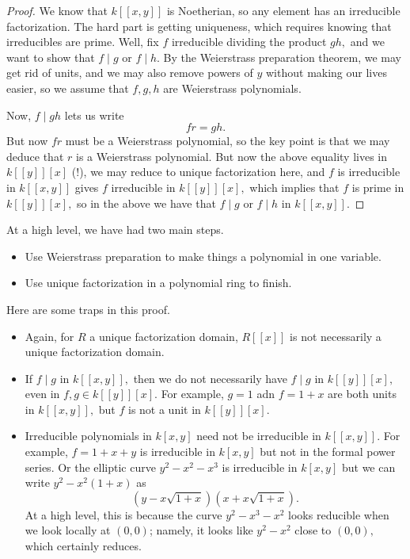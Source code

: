 \documentclass[../notes.tex]{subfiles}
\begin{document}
\begin{proof}
	We know that $k[[x,y]]$ is Noetherian, so any element has an irreducible factorization. The hard part is getting uniqueness, which requires knowing that irreducibles are prime. Well, fix $f$ irreducible dividing the product $gh,$ and we want to show that $f\mid g$ or $f\mid h.$ By the Weierstrass preparation theorem, we may get rid of units, and we may also remove powers of $y$ without making our lives easier, so we assume that $f,g,h$ are Weierstrass polynomials.

	Now, $f\mid gh$ lets us write
	\[fr=gh.\]
	But now $fr$ must be a Weierstrass polynomial, so the key point is that we may deduce that $r$ is a Weierstrass polynomial. But now the above equality lives in $k[[y]][x]$ (!), we may reduce to unique factorization here, and $f$ is irreducible in $k[[x,y]]$ gives $f$ irreducible in $k[[y]][x],$ which implies that $f$ is prime in $k[[y]][x],$ so in the above we have that $f\mid g$ or $f\mid h$ in $k[[x,y]].$
\end{proof}
At a high level, we have had two main steps.
\begin{itemize}
	\item Use Weierstrass preparation to make things a polynomial in one variable.
	\item Use unique factorization in a polynomial ring to finish.
\end{itemize}
\begin{remark}
	Here are some traps in this proof.
	\begin{itemize}
		\item Again, for $R$ a unique factorization domain, $R[[x]]$ is not necessarily a unique factorization domain.
		\item If $f\mid g$ in $k[[x,y]],$ then we do not necessarily have $f\mid g$ in $k[[y]][x],$ even in $f,g\in k[[y]][x].$ For example, $g=1$ adn $f=1+x$ are both units in $k[[x,y]],$ but $f$ is not a unit in $k[[y]][x].$
		\item Irreducible polynomials in $k[x,y]$ need not be irreducible in $k[[x,y]].$ For example, $f=1+x+y$ is irreducible in $k[x,y]$ but not in the formal power series. Or the elliptic curve $y^2-x^2-x^3$ is irreducible in $k[x,y]$ but we can write $y^2-x^2(1+x)$ as
		\[\left(y-x\sqrt{1+x}\right)\left(x+x\sqrt{1+x}\right).\]
		At a high level, this is because the curve $y^2-x^3-x^2$ looks reducible when we look locally at $(0,0)$; namely, it looks like $y^2-x^2$ close to $(0,0),$ which certainly reduces.
	\end{itemize}
\end{remark}
\end{document}
